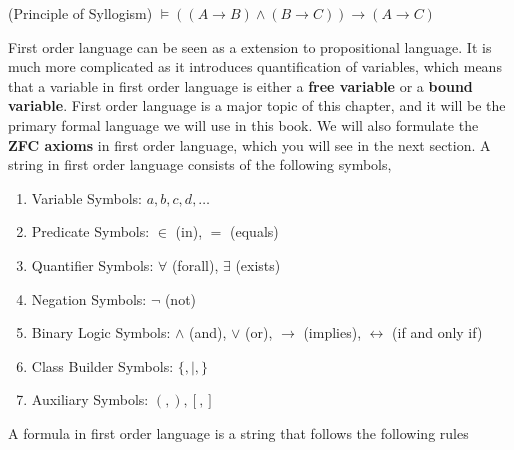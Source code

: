 \documentclass[11pt]{book}
\begin{document}
\begin{example}
{	\item (Principle of Syllogism) $\vDash ((A\rightarrow B)\land (B\rightarrow C))\rightarrow (A\rightarrow C)$
}
\end{example}

First order language can be seen as a extension to propositional language. It is much more complicated as it introduces quantification of variables, which means that a variable in first order language is either a \textbf{free variable} or a \textbf{bound variable}. First order language is a major topic of this chapter, and it will be the primary formal language we will use in this book. We will also formulate the \textbf{ZFC axioms} in first order language, which you will see in the next section. A string in first order language consists of the following symbols,
\begin{enumerate}[label=\roman*.]
	\item Variable Symbols: $a,b,c,d,\dots$
	\item Predicate Symbols: $\in$ (in), $=$ (equals) 
	\item Quantifier Symbols: $\forall$ (forall), $\exists$ (exists)
	\item Negation Symbols: $\neg$ (not)
	\item Binary Logic Symbols: $\land$ (and), $\lor$ (or), $\rightarrow$ (implies), $\leftrightarrow$ (if and only if)
	\item Class Builder Symbols: $\{,|,\}$
	\item Auxiliary Symbols: $(,),[,]$
\end{enumerate}
A formula in first order language is a string that follows the following rules
\end{document}
